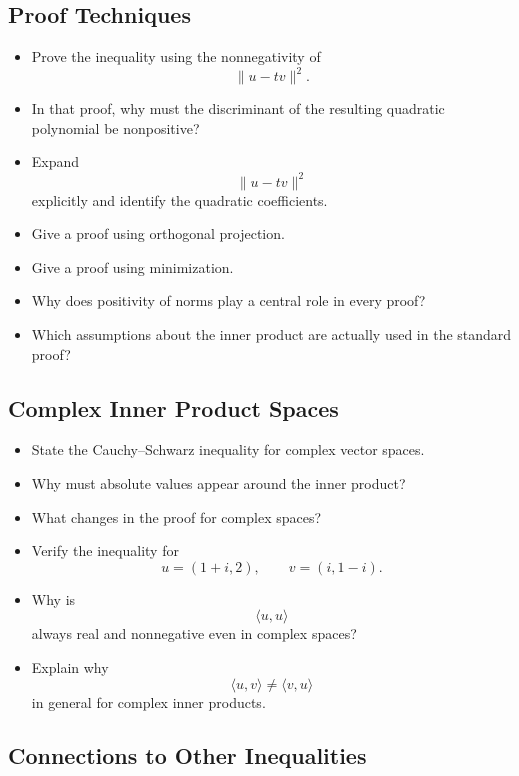 \subsection{Proof Techniques}

\begin{itemize}[resume]
  \item Prove the inequality using the nonnegativity of
    \[
      \|u-tv\|^2.
    \]
  \item In that proof, why must the discriminant of the resulting quadratic polynomial be nonpositive?
  \item Expand
    \[
      \|u-tv\|^2
    \]
    explicitly and identify the quadratic coefficients.
  \item Give a proof using orthogonal projection.
  \item Give a proof using minimization.
  \item Why does positivity of norms play a central role in every proof?
  \item Which assumptions about the inner product are actually used in the standard proof?
\end{itemize}

\subsection{Complex Inner Product Spaces}

\begin{itemize}[resume]
  \item State the Cauchy--Schwarz inequality for complex vector spaces.
  \item Why must absolute values appear around the inner product?
  \item What changes in the proof for complex spaces?
  \item Verify the inequality for
    \[
      u=(1+i,2), \qquad v=(i,1-i).
    \]
  \item Why is
    \[
      \langle u,u\rangle
    \]
    always real and nonnegative even in complex spaces?
  \item Explain why
    \[
      \langle u,v\rangle \neq \langle v,u\rangle
    \]
    in general for complex inner products.
\end{itemize}

\subsection{Connections to Other Inequalities}

